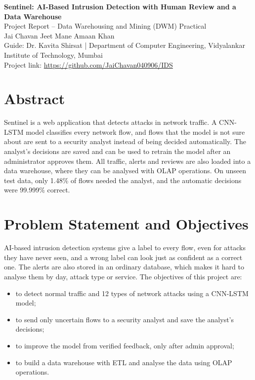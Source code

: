 \documentclass[11pt,a4paper]{article}
\begin{document}
\begin{center}
{\Large\bfseries Sentinel: AI-Based Intrusion Detection with Human Review and a Data Warehouse}\\[5pt]
Project Report -- Data Warehousing and Mining (DWM) Practical\\[3pt]
Jai Chavan \quad Jeet Mane \quad Amaan Khan\\[1pt]
Guide: Dr. Kavita Shirsat \quad | \quad Department of Computer Engineering, Vidyalankar Institute of Technology, Mumbai\\[1pt]
Project link: \url{https://github.com/JaiChavan040906/IDS}
\end{center}

\section{Abstract}
Sentinel is a web application that detects attacks in network traffic. A CNN-LSTM model
classifies every network flow, and flows that the model is not sure about are sent to a security
analyst instead of being decided automatically. The analyst's decisions are saved and can be used
to retrain the model after an administrator approves them. All traffic, alerts and reviews are
also loaded into a data warehouse, where they can be analysed with OLAP operations. On unseen
test data, only 1.48\% of flows needed the analyst, and the automatic decisions were 99.999\%
correct.

\section{Problem Statement and Objectives}
AI-based intrusion detection systems give a label to every flow, even for attacks they have never
seen, and a wrong label can look just as confident as a correct one. The alerts are also stored in
an ordinary database, which makes it hard to analyse them by day, attack type or service. The
objectives of this project are:
\begin{itemize}
\item to detect normal traffic and 12 types of network attacks using a CNN-LSTM model;
\item to send only uncertain flows to a security analyst and save the analyst's decisions;
\item to improve the model from verified feedback, only after admin approval;
\item to build a data warehouse with ETL and analyse the data using OLAP operations.
\end{itemize}
\end{document}
